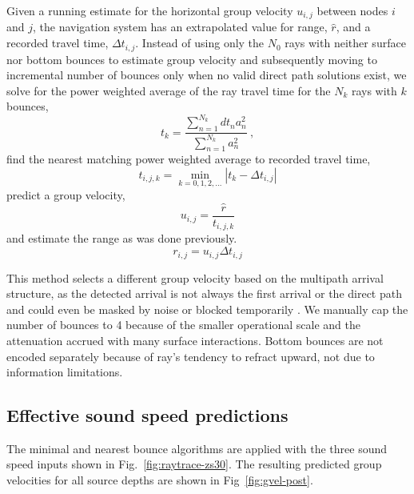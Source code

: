 Given a running estimate for the horizontal group velocity $u_{i,j}$ between nodes $i$ and $j$, the navigation system has an extrapolated value for range, $\hat{r}$, and a recorded travel time, $\Delta t_{i,j}$.
Instead of using only the $N_0$ rays with neither surface nor bottom bounces to estimate group velocity and subsequently moving to incremental number of bounces only when no valid direct path solutions exist, we solve for the power weighted average of the ray travel time for the $N_k$ rays with $k$ bounces,
\begin{equation}
t_k = \frac{\sum_{n=1}^{N_{k}} dt_{n}a_{n}^{2}}{\sum_{n=1}^{N_{k}} a_{n}^{2}} ~, 
\end{equation}
find the nearest matching power weighted average to recorded travel time,
\begin{equation}
t_{i,j,k} = \min_{k=0,1,2,...} \left| t_k - \Delta t_{i,j} \right|
\end{equation}
predict a group velocity,
\begin{equation}
u_{i,j} = \dfrac{\hat{r}}{t_{i,j,k}}
\end{equation}
and estimate the range as was done previously.
\begin{equation}
r_{i,j} = u_{i,j}\Delta t_{i,j}
\end{equation}

This method selects a different group velocity based on the multipath arrival structure, as the detected arrival is not always the first arrival or the direct path and could even be masked by noise or blocked temporarily \citep{deffenbaugh1996acoustic}.
We manually cap the number of bounces to 4 because of the smaller operational scale and the attenuation accrued with many surface interactions.
Bottom bounces are not encoded separately because of ray's tendency to refract upward, not due to information limitations.

\subsection{Effective sound speed predictions}

The minimal and nearest bounce algorithms are applied with the three sound speed inputs shown in Fig.~\ref{fig:raytrace-zs30}.
The resulting predicted group velocities for all source depths are shown in Fig~\ref{fig:gvel-post}.

